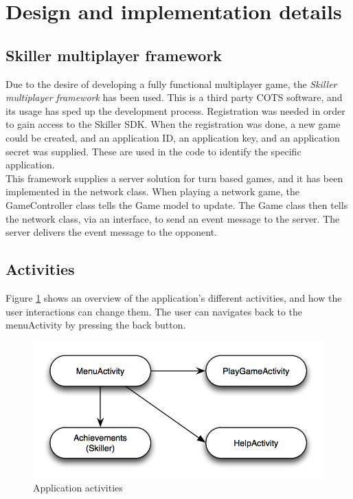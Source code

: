 \section{Design and implementation details}

\subsection{Skiller multiplayer framework}
Due to the desire of developing a fully functional multiplayer game, the \emph{Skiller multiplayer framework} \cite{skiller} has been used. This is a third party COTS software, and its usage has sped up the development process. Registration was needed in order to gain access to the Skiller SDK. When the registration was done, a new game could be created, and an application ID, an application key, and an application secret was supplied. These are used in the code to identify the specific application. \\

This framework supplies a server solution for turn based games, and it has been implemented in the network class. When playing a network game, the GameController class tells the Game model to update. The Game class then tells the network class, via an interface, to send an event message to the server. The server delivers the event message to the opponent. 

\pagebreak
\subsection{Activities}
Figure \ref{fig:activities} shows an overview of the application's different activities, and how the user interactions can change them. The user can navigates back to the menuActivity by pressing the back button.\\

\begin{figure}[H]
\includegraphics[width=1\textwidth]{Images/activities}
\caption{Application activities}
\label{fig:activities}
\end{figure}

